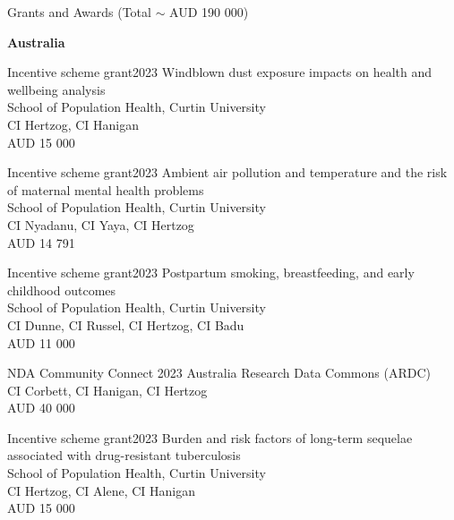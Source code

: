 \begin{rSection}{Grants and Awards (Total $\sim$ AUD 190 000)}
\begin{center}
\large \textbf{Australia}
\end{center}

\par
\begin{rSubsection}
{Incentive scheme grant}{2023}
{Windblown dust exposure impacts on health and wellbeing analysis}\\
{School of Population Health, Curtin University}\\
{CI Hertzog, CI Hanigan}\\
{AUD 15 000}
\end{rSubsection}

\begin{rSubsection}
{Incentive scheme grant}{2023}
{Ambient air pollution and temperature and the risk of maternal mental health problems}\\
{School of Population Health, Curtin University}\\
{CI Nyadanu, CI Yaya, CI Hertzog}\\
{AUD 14 791}
\end{rSubsection}

\begin{rSubsection}
{Incentive scheme grant}{2023}
{Postpartum smoking, breastfeeding, and early childhood outcomes}\\
{School of Population Health, Curtin University}\\
{CI Dunne, CI Russel, CI Hertzog, CI Badu}\\
{AUD 11 000}
\end{rSubsection}

\begin{rSubsection}
{NDA Community Connect }{2023}
{Australia Research Data Commons (ARDC)}\\
{CI Corbett, CI Hanigan, CI Hertzog}\\
{AUD 40 000}
\end{rSubsection}

\begin{rSubsection}
{Incentive scheme grant}{2023}
{Burden and risk factors of long-term sequelae associated with drug-resistant tuberculosis}\\
{School of Population Health, Curtin University}\\
{CI Hertzog, CI Alene, CI Hanigan}\\
{AUD 15 000}
\end{rSubsection}


\end{rSection}
